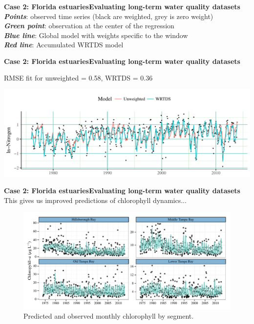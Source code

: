 \documentclass[serif]{beamer}\usepackage[]{graphicx}\usepackage[]{color}
\newcommand{\Bigtxt}[1]{\textbf{\textit{#1}}}
\begin{document}
\begin{frame}{\textbf{Case 2: Florida estuaries}}{\textbf{Evaluating long-term water quality datasets}}
{\small
\Bigtxt{Points}: observed time series (black are weighted, grey is zero weight)\\
\Bigtxt{Green point}: observation at the center of the regression\\
\Bigtxt{Blue line}: Global model with weights specific to the window\\
\Bigtxt{Red line}: Accumulated WRTDS model
}
\begin{center}
\end{center}
\end{frame}



\begin{frame}{\textbf{Case 2: Florida estuaries}}{\textbf{Evaluating long-term water quality datasets}}
\centerline{RMSE fit for unweighted = 0.58, WRTDS = 0.36}
\begin{center}
\includegraphics[width = \textwidth]{fig/wrtds_perf.pdf}
\end{center}
\end{frame}

\begin{frame}{\textbf{Case 2: Florida estuaries}}{\textbf{Evaluating long-term water quality datasets}}
This gives us improved predictions of chlorophyll dynamics...
\begin{figure}[!ht]

{\centering \includegraphics[width=\linewidth]{fig/predvals-1} 

}

\caption[Predicted and observed monthly chlorophyll by segment]{Predicted and observed monthly chlorophyll by segment.}\label{fig:predvals}
\end{figure}


\end{frame}
\end{document}
